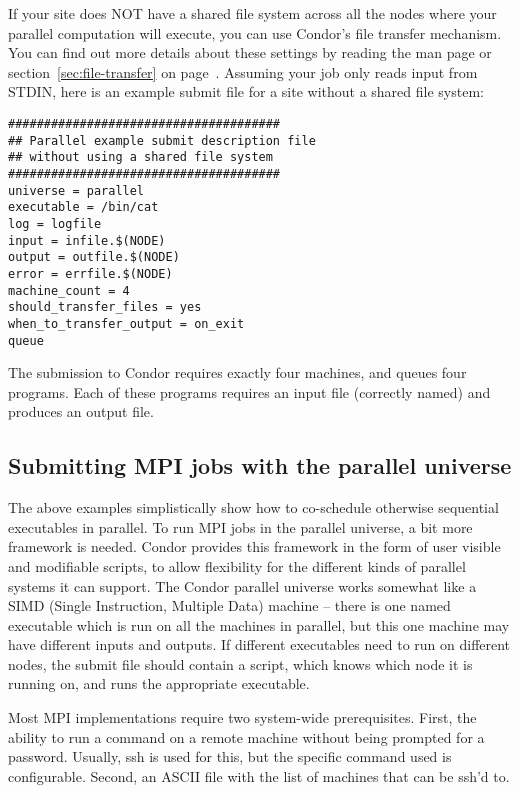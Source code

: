 If your site does NOT have a shared file system across all the nodes
where your parallel computation will execute, you can use Condor's
file transfer mechanism.  You can find out more details about these
settings by reading the  man page or
section~\ref{sec:file-transfer} on page~\pageref{sec:file-transfer}.
Assuming your job only reads input from STDIN, here is an example
submit file for a site without a shared file system:

\begin{verbatim}
######################################
## Parallel example submit description file
## without using a shared file system
######################################
universe = parallel
executable = /bin/cat
log = logfile
input = infile.$(NODE)
output = outfile.$(NODE)
error = errfile.$(NODE)
machine_count = 4
should_transfer_files = yes
when_to_transfer_output = on_exit
queue
\end{verbatim}

The submission to Condor requires exactly four machines,
and queues four programs.
Each of these programs requires an input file (correctly
named) and produces an output file.

\subsection{\label{sec:parallel-mpi-submit}Submitting MPI jobs with the parallel universe}

The above examples simplistically show how to co-schedule otherwise
sequential executables in parallel.  To run MPI jobs in the parallel
universe, a bit more framework is needed.  Condor provides this
framework in the form of user visible and modifiable scripts, to allow
flexibility for the different kinds of parallel systems it can
support.  The Condor parallel universe works somewhat like a SIMD
(Single Instruction, Multiple Data) machine -- there is one named
executable which is run on all the machines in parallel, but this one
machine may have different inputs and outputs.  If different
executables need to run on different nodes, the submit file
should contain a script, which knows which node it is running on, and
runs the appropriate executable.

Most MPI implementations require two system-wide prerequisites.
First, the ability to run a command on a remote machine without being
prompted for a password.  Usually, ssh is used for this, but the
specific command used is configurable.  Second, an ASCII file with the
list of machines that can be ssh'd to.

